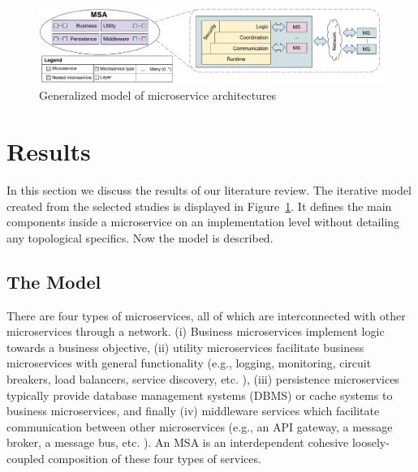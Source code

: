 
\begin{figure}[tpb]
    \includegraphics[scale=0.42]{images/msa-model.pdf}
    \caption{Generalized model of microservice architectures}
    \label{fig:model}
\end{figure}

\section{Results}\label{sec:results}

In this section we discuss the results of our literature review. The iterative model created from the selected studies is displayed in Figure~\ref{fig:model}. It defines the main components inside a microservice on an implementation level without detailing any topological specifics. Now the model is described.

\subsection{The Model}

There are four types of microservices, all of which are interconnected with other microservices through a network. (i) Business microservices implement logic towards a business objective, (ii) utility microservices facilitate business microservices with general functionality (e.g., logging, monitoring, circuit breakers, load balancers, service discovery, etc. \cite{richardson2018microservices}), (iii) persistence microservices typically provide database management systems (DBMS) or cache systems to business microservices, and finally (iv) middleware services which facilitate communication between other microservices (e.g., an API gateway, a message broker, a message bus, etc. \cite{richardson2018microservices,Garriga2018203}). An MSA is an interdependent cohesive loosely-coupled composition of these four types of services.

